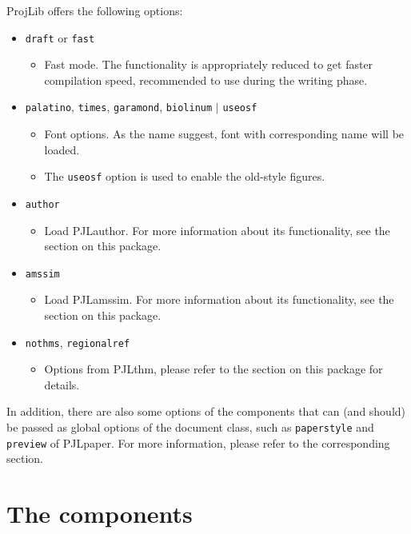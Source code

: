 \documentclass[allowbf,regionalref,puretext]{lebhart}
\providecommand{\ProjLibPackage}{\textsf{ProjLib}}
\providecommand{\PJLamssim}{\textsf{PJLamssim}}
\providecommand{\PJLauthor}{\textsf{PJLauthor}}
\providecommand{\PJLpaper}{\textsf{PJLpaper}}
\providecommand{\PJLthm}{\textsf{PJLthm}}
\begin{document}
\ProjLibPackage{} offers the following options:
\begin{itemize}
    \item \texttt{draft} or \texttt{fast}
        \begin{itemize}
            \item Fast mode. The functionality is appropriately reduced to get faster compilation speed, recommended to use during the writing phase.
        \end{itemize}
    \item \texttt{palatino}, \texttt{times}, \texttt{garamond}, \texttt{biolinum} $|$ \texttt{useosf}
        \begin{itemize}
            \item Font options. As the name suggest, font with corresponding name will be loaded. 
            \item The \texttt{useosf} option is used to enable the old-style figures.
        \end{itemize}
    \item \texttt{author}
        \begin{itemize}
            \item Load \PJLauthor{}. For more information about its functionality, see the section on this package.
        \end{itemize}
    \item \texttt{amssim}
        \begin{itemize}
            \item Load \PJLamssim{}. For more information about its functionality, see the section on this package.
        \end{itemize}
    \item \texttt{nothms}, \texttt{regionalref}
        \begin{itemize}
            \item Options from \PJLthm{}, please refer to the section on this package for details.
        \end{itemize}
\end{itemize}
In addition, there are also some options of the components that can (and should) be passed as global options of the document class, such as \texttt{paperstyle} and \texttt{preview} of \PJLpaper{}. For more information, please refer to the corresponding section.

\section{The components}
\end{document}
